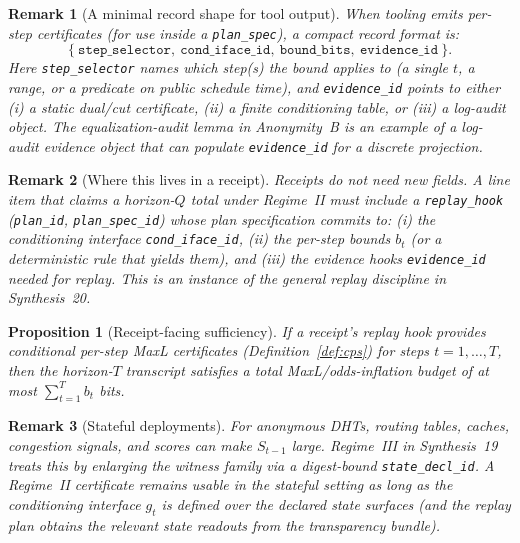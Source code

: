 \documentclass[11pt]{article}
\newtheorem{proposition}{Proposition}
\newtheorem{remark}{Remark}
\begin{document}
\begin{remark}[A minimal record shape for tool output]
When tooling emits per-step certificates (for use inside a \texttt{plan\_spec}), a compact record format is:
\[
\{\ \texttt{step\_selector},\ \texttt{cond\_iface\_id},\ \texttt{bound\_bits},\ \texttt{evidence\_id}\ \}.
\]
Here \texttt{step\_selector} names which step(s) the bound applies to (a single $t$, a range, or a predicate on public schedule time), and \texttt{evidence\_id} points to either (i) a static dual/cut certificate, (ii) a finite conditioning table, or (iii) a log-audit object.
The equalization-audit lemma in Anonymity~B is an example of a log-audit evidence object that can populate \texttt{evidence\_id} for a discrete projection.\cite{series:profiling}
\end{remark}



\begin{remark}[Where this lives in a receipt]
Receipts do \emph{not} need new fields.
A line item that claims a horizon-$Q$ total under Regime~II must include a \texttt{replay\_hook}
(\texttt{plan\_id}, \texttt{plan\_spec\_id}) whose plan specification commits to:
(i) the conditioning interface \texttt{cond\_iface\_id},
(ii) the per-step bounds $b_t$ (or a deterministic rule that yields them), and
(iii) the evidence hooks \texttt{evidence\_id} needed for replay.
This is an instance of the general replay discipline in Synthesis~20.\cite{series:auditorreplay}
\end{remark}

\begin{proposition}[Receipt-facing sufficiency]\label{prop:suff}
If a receipt's replay hook provides conditional per-step MaxL certificates (Definition~\ref{def:cps}) for steps $t=1,\dots,T$,
then the horizon-$T$ transcript satisfies a total MaxL/odds-inflation budget of at most $\sum_{t=1}^T b_t$ bits.
\end{proposition}

\begin{remark}[Stateful deployments]
For anonymous DHTs, routing tables, caches, congestion signals, and scores can make $S_{t-1}$ large.
Regime~III in Synthesis~19 treats this by enlarging the witness family via a digest-bound \texttt{state\_decl\_id}.\cite{series:accountingrulebook,series:planstateequiv}
A Regime~II certificate remains usable in the stateful setting as long as the conditioning interface $g_t$ is defined over the declared state surfaces
(and the replay plan obtains the relevant state readouts from the transparency bundle).
\end{remark}
\end{document}
